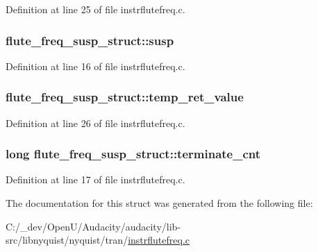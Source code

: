 Definition at line 25 of file instrflutefreq.\+c.

\subsubsection[{\texorpdfstring{susp}{susp}}]{ flute\+\_\+freq\+\_\+susp\+\_\+struct\+::susp}\hypertarget{structflute__freq__susp__struct_af4f88fabb13a789f3ee7d49c0b5c8fa6}{}\label{structflute__freq__susp__struct_af4f88fabb13a789f3ee7d49c0b5c8fa6}


Definition at line 16 of file instrflutefreq.\+c.

\subsubsection[{\texorpdfstring{temp\+\_\+ret\+\_\+value}{temp_ret_value}}]{ flute\+\_\+freq\+\_\+susp\+\_\+struct\+::temp\+\_\+ret\+\_\+value}\hypertarget{structflute__freq__susp__struct_a56811b80661ab7e1ef5769547c40a043}{}\label{structflute__freq__susp__struct_a56811b80661ab7e1ef5769547c40a043}


Definition at line 26 of file instrflutefreq.\+c.

\subsubsection[{\texorpdfstring{terminate\+\_\+cnt}{terminate_cnt}}]{\setlength{\rightskip}{0pt plus 5cm}long flute\+\_\+freq\+\_\+susp\+\_\+struct\+::terminate\+\_\+cnt}\hypertarget{structflute__freq__susp__struct_a17a672446696cda74dd06f0052dbaa9f}{}\label{structflute__freq__susp__struct_a17a672446696cda74dd06f0052dbaa9f}


Definition at line 17 of file instrflutefreq.\+c.



The documentation for this struct was generated from the following file\+:\begin{DoxyCompactItemize}
\item 
C\+:/\+\_\+dev/\+Open\+U/\+Audacity/audacity/lib-\/src/libnyquist/nyquist/tran/\hyperlink{instrflutefreq_8c}{instrflutefreq.\+c}\end{DoxyCompactItemize}
